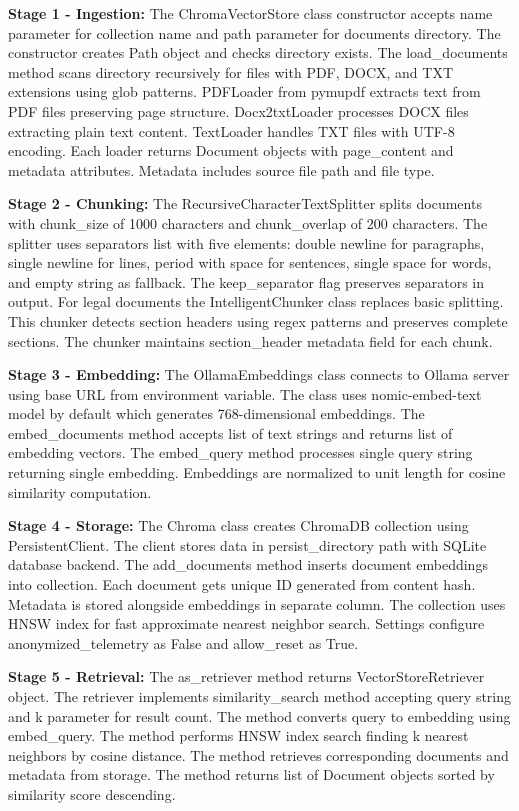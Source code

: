 \documentclass[12pt,singleside,a4paper]{article}
\begin{document}
\textbf{Stage 1 - Ingestion:} The ChromaVectorStore class constructor accepts name parameter for collection name and path parameter for documents directory. The constructor creates Path object and checks directory exists. The load\_documents method scans directory recursively for files with PDF, DOCX, and TXT extensions using glob patterns. PDFLoader from pymupdf extracts text from PDF files preserving page structure. Docx2txtLoader processes DOCX files extracting plain text content. TextLoader handles TXT files with UTF-8 encoding. Each loader returns Document objects with page\_content and metadata attributes. Metadata includes source file path and file type.

\textbf{Stage 2 - Chunking:} The RecursiveCharacterTextSplitter splits documents with chunk\_size of 1000 characters and chunk\_overlap of 200 characters. The splitter uses separators list with five elements: double newline for paragraphs, single newline for lines, period with space for sentences, single space for words, and empty string as fallback. The keep\_separator flag preserves separators in output. For legal documents the IntelligentChunker class replaces basic splitting. This chunker detects section headers using regex patterns and preserves complete sections. The chunker maintains section\_header metadata field for each chunk.

\textbf{Stage 3 - Embedding:} The OllamaEmbeddings class connects to Ollama server using base URL from environment variable. The class uses nomic-embed-text model by default which generates 768-dimensional embeddings. The embed\_documents method accepts list of text strings and returns list of embedding vectors. The embed\_query method processes single query string returning single embedding. Embeddings are normalized to unit length for cosine similarity computation.

\textbf{Stage 4 - Storage:} The Chroma class creates ChromaDB collection using PersistentClient. The client stores data in persist\_directory path with SQLite database backend. The add\_documents method inserts document embeddings into collection. Each document gets unique ID generated from content hash. Metadata is stored alongside embeddings in separate column. The collection uses HNSW index for fast approximate nearest neighbor search. Settings configure anonymized\_telemetry as False and allow\_reset as True.

\textbf{Stage 5 - Retrieval:} The as\_retriever method returns VectorStoreRetriever object. The retriever implements similarity\_search method accepting query string and k parameter for result count. The method converts query to embedding using embed\_query. The method performs HNSW index search finding k nearest neighbors by cosine distance. The method retrieves corresponding documents and metadata from storage. The method returns list of Document objects sorted by similarity score descending.
\end{document}
